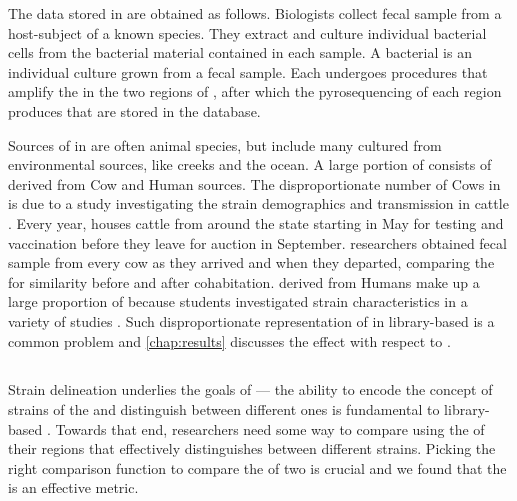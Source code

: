 The data stored in \cplop{} are obtained as follows.
Biologists collect fecal sample from a host-subject of a known species.
They extract \ecoli{} and culture individual bacterial cells from the bacterial material contained in each sample.
A bacterial \textit{\isol{}} is an individual culture grown from a fecal sample.
\index{\isol{}}
Each \isol{} undergoes \pcr{} procedures that amplify the \dna{} in the two \itsshort{} regions of \dna{}, after which the pyrosequencing of each region produces \pyros{} that are stored in the \cplop{} database.

Sources of \isols{} in \cplop{} are often animal species, but include many \isols{} cultured from environmental sources, like creeks and the ocean.
A large portion of \cplop{} consists of \isols{} derived from Cow and Human sources.
The disproportionate number of Cows in \cplop{} is due to a study investigating the strain demographics and transmission in cattle \cite{dillard2013coli, dillard2015demographics}.
Every year, \cp{} houses cattle from around the state starting in May for testing and vaccination before they leave for auction in September.
\cp{} researchers obtained fecal sample from every cow as they arrived and when they departed, comparing the \isols{} for similarity before and after cohabitation.
\Isols{} derived from Humans make up a large proportion of \cplop{} because \cp{} students investigated \ecoli{} strain characteristics in a variety of studies \cite{neal2013escherichia, montana2012investigating, neal2012demographics}.
Such disproportionate representation of \spec{} in library-based \mst{} is a common problem and \autoref{chap:results} discusses the effect with respect to \cplop{}.

\subsection{\Pearson{}}
Strain delineation underlies the goals of \cplop{} --- the ability to encode the concept of strains of the \fib{} \ecoli{} and distinguish between different ones is fundamental to library-based \mst{}.
Towards that end, \cplop{} researchers need some way to compare \isols{} using the \pyros{} of their \itsshort{} regions that effectively distinguishes between different strains.
Picking the right comparison function to compare the \pyros{} of two \isols{} is crucial and we found that the \Pearson{} is an effective metric.

